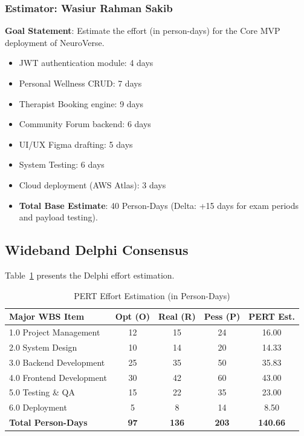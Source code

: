 \documentclass[a4paper,11pt]{report}
\begin{document}
\subsubsection{Estimator: Wasiur Rahman Sakib}
\textbf{Goal Statement}: Estimate the effort (in person-days) for the Core MVP deployment of NeuroVerse.
\begin{itemize}
    \item JWT authentication module: 4 days
    \item Personal Wellness CRUD: 7 days
    \item Therapist Booking engine: 9 days
    \item Community Forum backend: 6 days
    \item UI/UX Figma drafting: 5 days
    \item System Testing: 6 days
    \item Cloud deployment (AWS Atlas): 3 days
    \item \textbf{Total Base Estimate}: 40 Person-Days (Delta: +15 days for exam periods and payload testing).
\end{itemize}

\subsection{Wideband Delphi Consensus}
Table~\ref{tab:delphi} presents the Delphi effort estimation.

\begin{table}[H]
\centering
\caption{PERT Effort Estimation (in Person-Days)}
\label{tab:delphi}
\begin{tabular}{|l|c|c|c|c|}
\hline
\textbf{Major WBS Item} & \textbf{Opt (O)} & \textbf{Real (R)} & \textbf{Pess (P)} & \textbf{PERT Est.} \\ \hline
1.0 Project Management & 12 & 15 & 24 & 16.00 \\ \hline
2.0 System Design & 10 & 14 & 20 & 14.33 \\ \hline
3.0 Backend Development & 25 & 35 & 50 & 35.83 \\ \hline
4.0 Frontend Development & 30 & 42 & 60 & 43.00 \\ \hline
5.0 Testing \& QA & 15 & 22 & 35 & 23.00 \\ \hline
6.0 Deployment & 5 & 8 & 14 & 8.50 \\ \hline
\textbf{Total Person-Days} & \textbf{97} & \textbf{136} & \textbf{203} & \textbf{140.66} \\ \hline
\end{tabular}
\end{table}
\end{document}
